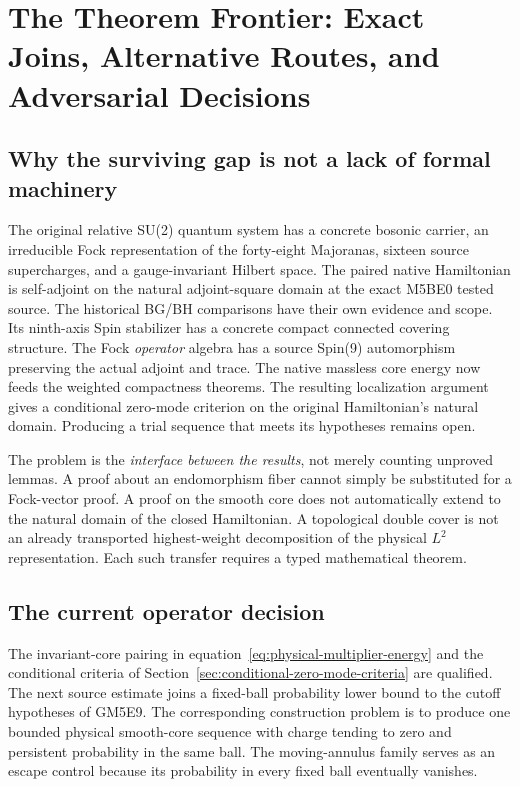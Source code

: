 \chapter[Theorem Frontier and Research Decisions]{The Theorem Frontier: Exact Joins, Alternative Routes, and Adversarial Decisions}
\label{ch:frontier}

\section{Why the surviving gap is not a lack of formal machinery}
The original relative SU(2) quantum system has a concrete bosonic
carrier, an irreducible Fock representation of the forty-eight
Majoranas, sixteen source supercharges, and a gauge-invariant
Hilbert space. The paired native Hamiltonian is self-adjoint on
the natural adjoint-square domain at the exact M5BE0 tested source.
The historical BG/BH comparisons have their own evidence and scope.
Its ninth-axis Spin stabilizer
has a concrete compact connected
covering structure. The Fock \emph{operator} algebra has a source
Spin(9) automorphism preserving the actual adjoint and trace.
The native massless core energy now feeds the weighted compactness
theorems. The resulting localization argument gives a conditional
zero-mode criterion on the original Hamiltonian's natural domain.
Producing a trial sequence that meets its hypotheses remains open.

The problem is the \emph{interface between the results}, not merely
counting unproved lemmas. A proof about an endomorphism fiber cannot
simply be substituted for a Fock-vector proof. A proof on the smooth
core does not automatically extend to the natural domain of the closed
Hamiltonian. A topological double cover is not an already transported
highest-weight decomposition of the physical $L^2$ representation.
Each such transfer requires a typed mathematical theorem.

\section{The current operator decision}
The invariant-core pairing in equation~\eqref{eq:physical-multiplier-energy}
and the conditional criteria of
Section~\ref{sec:conditional-zero-mode-criteria} are qualified.
The next source estimate joins a fixed-ball probability lower bound
to the cutoff hypotheses of GM5E9. The corresponding construction
problem is to produce one bounded physical smooth-core sequence with
charge tending to zero and persistent probability in the same ball.
The moving-annulus family serves as an escape control because its
probability in every fixed ball eventually vanishes.

